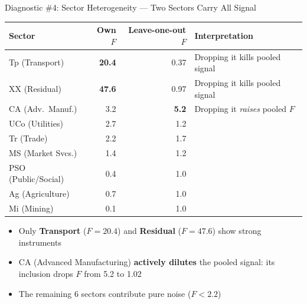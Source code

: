 \documentclass[aspectratio=169,11pt]{beamer}
\begin{document}
\begin{frame}{Diagnostic \#4: Sector Heterogeneity --- Two Sectors Carry All Signal}

\begin{center}
\small
\begin{tabular}{l r r l}
\toprule
\textbf{Sector} & \textbf{Own $F$} & \textbf{Leave-one-out $F$} & \textbf{Interpretation} \\
\midrule
Tp (Transport)       & \textbf{20.4} & 0.37 & Dropping it kills pooled signal \\
XX (Residual)        & \textbf{47.6} & 0.97 & Dropping it kills pooled signal \\
CA (Adv.\ Manuf.)    & 3.2           & \textbf{5.2}  & Dropping it \emph{raises} pooled $F$ \\
UCo (Utilities)      & 2.7           & 1.2  & \\
Tr (Trade)           & 2.2           & 1.7  & \\
MS (Market Svcs.)    & 1.4           & 1.2  & \\
PSO (Public/Social)  & 0.4           & 1.0  & \\
Ag (Agriculture)     & 0.7           & 1.0  & \\
Mi (Mining)          & 0.1           & 1.0  & \\
\bottomrule
\end{tabular}
\end{center}

\medskip

\begin{itemize}\setlength{\itemsep}{2pt}
    \item Only \textbf{Transport} ($F = 20.4$) and \textbf{Residual} ($F = 47.6$) show strong instruments
    \item CA (Advanced Manufacturing) \textbf{actively dilutes} the pooled signal: its inclusion drops $F$ from 5.2 to 1.02
    \item The remaining 6 sectors contribute pure noise ($F < 2.2$)
\end{itemize}

\end{frame}
\end{document}
